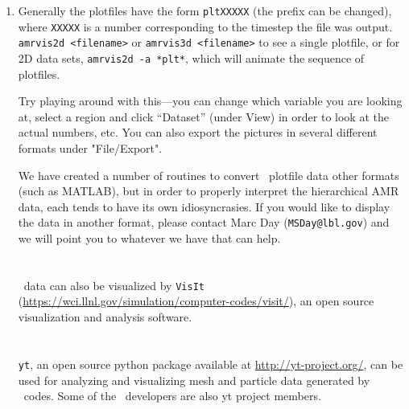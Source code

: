 \begin{enumerate}
\item Generally the plotfiles have the form {\tt *pltXXXXX} 
  (the prefix can be changed), where {\tt XXXXX} is a number 
  corresponding to the timestep the file
  was output.  {\tt amrvis2d <filename>} or {\tt amrvis3d <filename>}
  to see a single plotfile, 
  or for 2D data sets, {\tt amrvis2d -a *plt*}, which will animate the 
  sequence of plotfiles.

  Try playing
  around with this---you can change which variable you are
  looking at, select a region and click ``Dataset'' (under View)
  in order to look at the actual numbers, etc. You can also export the
  pictures in several different formats under "File/Export".

  We have created a number of routines to convert \amrex\ plotfile data
  other formats (such as MATLAB), but in order to properly interpret 
  the hierarchical AMR data, each tends to have its own idiosyncrasies.
  If you would like to display the data in another format, please contact
  Marc Day ({\tt MSDay@lbl.gov}) and we will point you to whatever we have
  that can help.

\section{\visit}

\amrex\ data can also be visualized by {\tt VisIt}
(\url{https://wci.llnl.gov/simulation/computer-codes/visit/}), an open
source visualization and analysis software.

\section{\yt}

{\tt yt}, an open source python package available at
\url{http://yt-project.org/}, can be used for analyzing and
visualizing mesh and particle data generated by \amrex\ codes.  Some
of the \amrex\ developers are also yt project members.

\end{enumerate}

